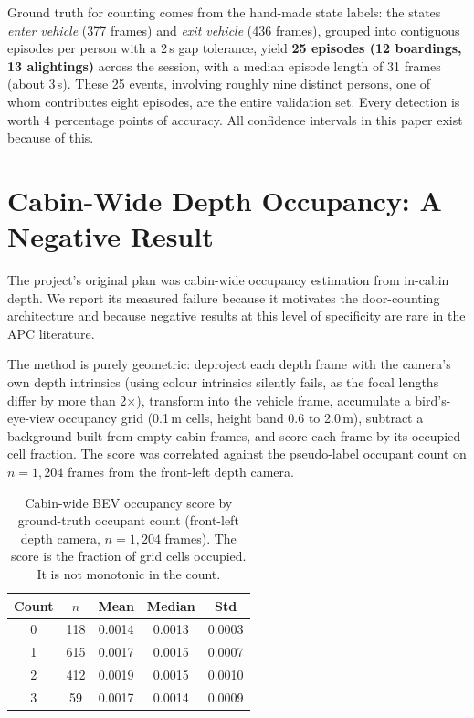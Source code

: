 \documentclass[conference]{IEEEtran}
\begin{document}
Ground truth for counting comes from the hand-made state labels: the states
\emph{enter vehicle} (377 frames) and \emph{exit vehicle} (436 frames),
grouped into contiguous episodes per person with a 2\,s gap tolerance, yield
\textbf{25 episodes (12 boardings, 13 alightings)} across the session, with a
median episode length of 31 frames (about 3\,s). These 25 events, involving
roughly nine distinct persons, one of whom contributes eight episodes, are the
entire validation set. Every detection is worth 4 percentage points of
accuracy. All confidence intervals in this paper exist because of this.

\section{Cabin-Wide Depth Occupancy: A Negative Result}
\label{sec:negative}

The project's original plan was cabin-wide occupancy estimation from in-cabin
depth. We report its measured failure because it motivates the door-counting
architecture and because negative results at this level of specificity are
rare in the APC literature.

The method is purely geometric: deproject each depth frame with the camera's
own depth intrinsics (using colour intrinsics silently fails, as the focal
lengths differ by more than 2$\times$), transform into the vehicle frame,
accumulate a bird's-eye-view occupancy grid (0.1\,m cells, height band 0.6 to
2.0\,m), subtract a background built from empty-cabin frames, and score each
frame by its occupied-cell fraction. The score was correlated against the
pseudo-label occupant count on $n=1{,}204$ frames from the front-left depth
camera.

\begin{table}[t]
\caption{Cabin-wide BEV occupancy score by ground-truth occupant count
(front-left depth camera, $n=1{,}204$ frames). The score is the fraction of
grid cells occupied. It is not monotonic in the count.}
\label{tab:bev}
\centering
\begin{tabular}{ccccc}
\toprule
Count & $n$ & Mean & Median & Std \\
\midrule
0 & 118 & 0.0014 & 0.0013 & 0.0003 \\
1 & 615 & 0.0017 & 0.0015 & 0.0007 \\
2 & 412 & 0.0019 & 0.0015 & 0.0010 \\
3 & 59  & 0.0017 & 0.0014 & 0.0009 \\
\bottomrule
\end{tabular}
\end{table}
\end{document}
